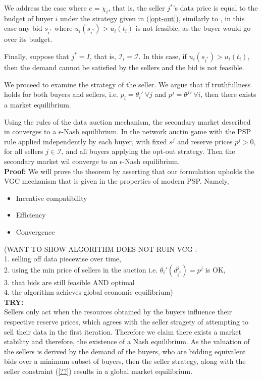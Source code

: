 \documentclass[12pt]{article}
\theoremstyle{definition}
\newcommand{\mcI}{\mathcal{I}}
\begin{document}
\begin{multicols}{2}
We address the case where $e=\chi_i$, that is, the seller $j^*$'s data price is
equal to the budget of buyer $i$ under the strategy given in
(\ref{opt-out}), similarly to \cite{semret}, in this case any bid $s_{i^*}$
where $u_i(s_{i^*}) > u_i(t_i)$ is not feasible, as the buyer would go over its
budget.

Finally, suppose that $j^* = I$, that is, $\mcI_i = \mcI$. 
In this case, if $u_i(s_{i^*}) > u_i(t_i)$, then
the demand cannot be satisfied by the sellers and the bid is not feasible. 

We proceed to examine the strategy of the seller. We argue that if
truthfullness holds for both buyers and sellers, i.e. $p_i ={\theta_i}' \
\forall j$ and $p^j = {\theta^j}' \ \forall i$, then there exists a market
equilibrium.

{
Using the rules of the data auction mechanism, the secondary market described in
\cite{zheng} converges to a $\epsilon$-Nash equilibrium. In the network auctin
game with the PSP rule applied independently by each buyer, with fixed $s^j$
and reserve prices $p^j>0$, for all sellers $j\in\mcI$, and all buyers applying
the opt-out strategy. Then the secondary market wil converge to an $\epsilon$-Nash
equilibrium.
}\\
\textbf{Proof:}
We will prove the theorem by asserting that our formulation upholds the VGC
mechanism that is given in the properties of modern PSP. Namely,
\begin{itemize}
    \item Incentive compatibility
    \item Efficiency 
    \item Convergence
\end{itemize}
(WANT TO SHOW ALGORITHM DOES NOT RUIN VCG : \\
1. selling off data piecewise over time, \\
2.
using the min price of sellers in the auction i.e. ${\theta_i}'(d_{i^*}^j) =
p^j$ is OK, \\
3. that bids are still feasible AND optimal \\
4. the algorithm achieves global economic equilibrium)\\
\textbf{TRY:}\\
Sellers only act when the resources obtained by the buyers influence their
respective reserve prices, which agrees with the seller stragety of attempting
to sell their data in the first iteration. Therefore we claim there exists a
market stability and therefore, the existence of a Nash equilibrium. As the
valuation of the sellers is derived by the demand of the buyers, who are
bidding equivalent bids over a minimum subset of buyers, then the seller
strategy, along with the seller constraint (\ref{??}) results in a global
market equilibrium.



\end{multicols}
\end{document}

